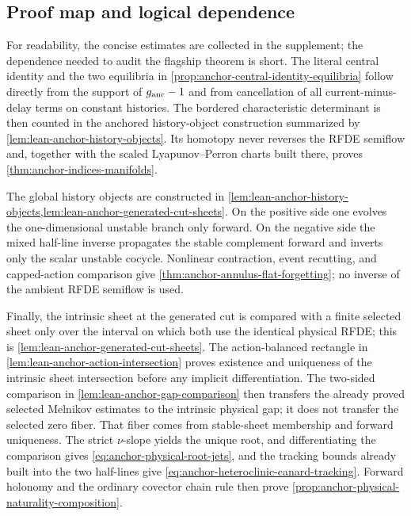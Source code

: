 \subsection{Proof map and logical dependence}

For readability, the concise estimates are collected in the supplement; the
dependence needed to audit the flagship theorem is short.  The literal
central identity and the two equilibria in \cref{prop:anchor-central-identity-equilibria}
follow directly from the support of \(g_{\rm anc}-1\) and from cancellation of
all current-minus-delay terms on constant histories.  The bordered
characteristic determinant is then counted in the anchored history-object
construction summarized by \cref{lem:lean-anchor-history-objects}.  Its
homotopy never reverses the RFDE semiflow and, together with the scaled
Lyapunov--Perron charts built there, proves
\cref{thm:anchor-indices-manifolds}.

The global history objects are constructed in
\cref{lem:lean-anchor-history-objects,lem:lean-anchor-generated-cut-sheets}.
On the positive side one evolves the
one-dimensional unstable branch only forward.  On the negative side the
mixed half-line inverse propagates the stable complement forward and inverts
only the scalar unstable cocycle.  Nonlinear contraction, event recutting,
and capped-action comparison give
\cref{thm:anchor-annulus-flat-forgetting}; no inverse of the ambient RFDE
semiflow is used.

Finally, the intrinsic sheet at the generated cut is compared with a finite
selected sheet only over the interval on which both use the identical
physical RFDE; this is \cref{lem:lean-anchor-generated-cut-sheets}.  The
action-balanced rectangle in \cref{lem:lean-anchor-action-intersection}
proves existence and uniqueness of the intrinsic sheet intersection before
any implicit differentiation.  The two-sided comparison in
\cref{lem:lean-anchor-gap-comparison} then transfers the already proved
selected Melnikov estimates to the intrinsic physical gap; it does not
transfer the selected zero fiber.  That fiber comes from stable-sheet
membership and forward uniqueness.  The strict \(\nu\)-slope yields the
unique root, and differentiating the comparison gives
\cref{eq:anchor-physical-root-jets}, and the tracking bounds already built
into the two half-lines give \cref{eq:anchor-heteroclinic-canard-tracking}.
Forward holonomy and the ordinary covector chain rule then prove
\cref{prop:anchor-physical-naturality-composition}.
